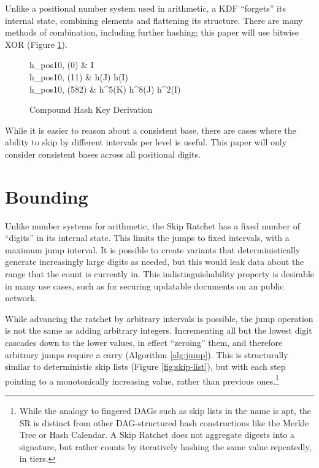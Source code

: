 \documentclass{article}
\begin{document}
    Unlike a positional number system used in arithmetic, a KDF ``forgets'' its internal state, combining elements and flattening its structure. There are many methods of combination, including further hashing; this paper will use bitwise \textsf{XOR} (Figure \ref{fig:compound-kdf}).
    
	\begin{figure}[h]
		\begin{flalign}
			h_{pos10, \oplus}(0)   & \Rightarrow I \nonumber \\
			h_{pos10, \oplus}(11)  & \Rightarrow h(J) \oplus h(I) \nonumber \\
			h_{pos10, \oplus}(582) & \Rightarrow h^{5}(K) \oplus h^{8}(J) \oplus h^{2}(I) \nonumber 
		\end{flalign}
	
		\caption{Compound Hash Key Derivation}
		\label{fig:compound-kdf}
	\end{figure}
    
	While it is easier to reason about a consistent base, there are cases where the ability to skip by different intervals per level is useful. This paper will only consider consistent bases across all positional digits.
    
    \section{Bounding}
    
    Unlike number systems for arithmetic, the Skip Ratchet has a fixed number of ``digits'' in its internal state. This limits the jumps to fixed intervals, with a maximum jump interval. It is possible to create variants that deterministically generate increasingly large digits as needed, but this would leak data about the range that the count is currently in. This indistinguishability property is desirable in many use cases, such as for securing updatable documents on an public network.
    
    While advancing the ratchet by arbitrary intervals is possible, the jump operation is not the same as adding arbitrary integers. Incrementing all but the lowest digit cascades down to the lower values, in effect ``zeroing'' them, and therefore arbitrary jumps require a carry (Algorithm \ref{alg:jump}). This is structurally similar to deterministic skip lists\cite{deterministic-skip-lists} (Figure \ref{fig:skip-list}), but with each step pointing to a monotonically increasing value, rather than previous ones.\footnote{While the analogy to fingered DAGs such as skip lists in the name is apt, the SR is distinct from other DAG-structured hash constructions like the Merkle Tree\cite{merkle-tree} or Hash Calendar\cite{distributed-hash-calendar}. A Skip Ratchet does not aggregate digests into a signature, but rather counts by iteratively hashing the same value repeatedly, in tiers.} \\
 
\end{document}
